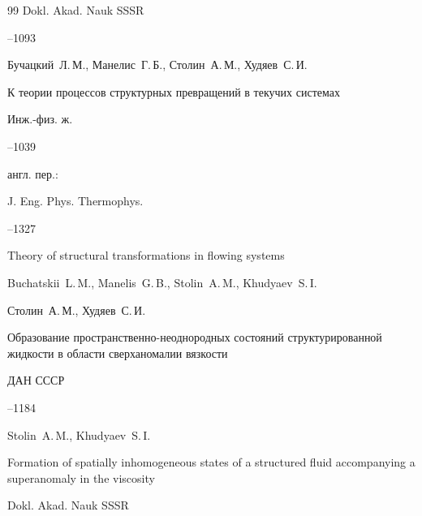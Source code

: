 \begin{thebibliography}{99}
\jour Dokl. Akad. Nauk SSSR 




–1093




\by Бучацкий~Л.\,М., Манелис~Г.\,Б., Столин~А.\,М., Худяев~С.\,И.

\paper К теории процессов структурных превращений в текучих системах

\jour Инж.-физ. ж.




--1039

\transl

англ. пер.:~

\jour J. Eng. Phys. Thermophys.




--1327


\paper Theory of structural transformations in flowing systems

\by Buchatskii~L.\,M., Manelis~G.\,B., Stolin~A.\,M.,  Khudyaev~S.\,I.






\by Столин~А.\,М., Худяев~С.\,И.

\paper Образование пространственно-неоднородных состояний структурированной жидкости в области сверханомалии вязкости

\jour ДАН СССР




--1184

\misctransl

\by Stolin~A.\,M.,  Khudyaev~S.\,I.

\paper Formation of spatially inhomogeneous states of a structured fluid accompanying a superanomaly in the viscosity

\jour Dokl. Akad. Nauk SSSR 




\end{thebibliography}
